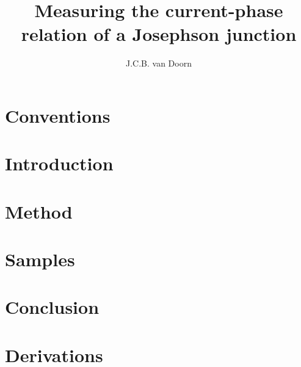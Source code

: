 \documentclass[twoside,single]{lion-msc}
\title{Measuring the current-phase relation of a Josephson junction}
\author{J.C.B. van Doorn}
\begin{document}
	\maketitle

	\tableofcontents

	\chapter*{Conventions}
	
	
	\chapter{Introduction}
	

	\chapter{Method}
	

	\chapter{Samples}
	

	\chapter{Conclusion}
	

	\appendix
	\chapter{Derivations}
	
	

	\printbibliography
\end{document}
